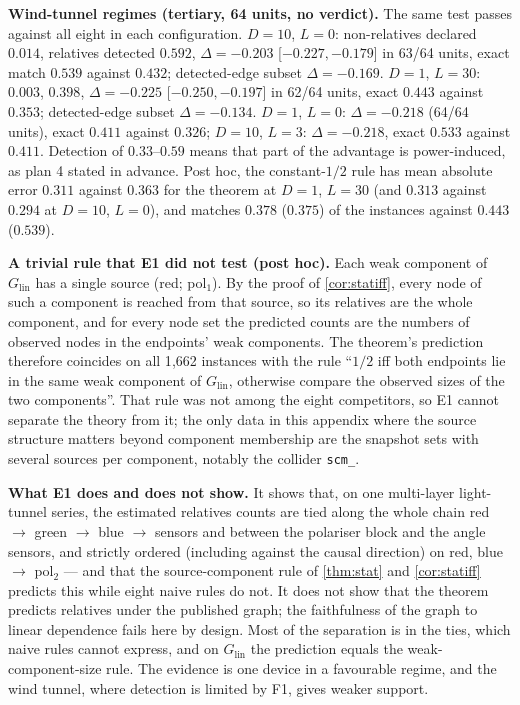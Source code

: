 \textbf{Wind-tunnel regimes (tertiary, 64 units, no verdict).} The same test passes against all eight in each configuration. $D=10$, $L=0$: non-relatives declared $0.014$, relatives detected $0.592$, $\Delta=-0.203$ [$-0.227,-0.179$] in 63/64 units, exact match $0.539$ against $0.432$; detected-edge subset $\Delta=-0.169$.
$D=1$, $L=30$: $0.003$, $0.398$, $\Delta=-0.225$ [$-0.250,-0.197$] in 62/64 units, exact $0.443$ against $0.353$; detected-edge subset $\Delta=-0.134$. $D=1$, $L=0$: $\Delta=-0.218$ (64/64 units), exact $0.411$ against $0.326$; $D=10$, $L=3$: $\Delta=-0.218$, exact $0.533$ against $0.411$.
Detection of $0.33$--$0.59$ means that part of the advantage is power-induced, as plan 4 stated in advance. Post hoc, the constant-$1/2$ rule has mean absolute error $0.311$ against $0.363$ for the theorem at $D=1$, $L=30$ (and $0.313$ against $0.294$ at $D=10$, $L=0$), and matches $0.378$ ($0.375$) of the instances against $0.443$ ($0.539$).

\textbf{A trivial rule that E1 did not test (post hoc).} Each weak component of
$G_{\mathrm{lin}}$ has a single source (red; pol$_1$). By the proof of
\cref{cor:statiff}, every node of such a component is reached from that source,
so its relatives are the whole component, and for every node set the
predicted counts are the numbers of observed nodes in the endpoints' weak
components. The theorem's prediction therefore coincides on all 1{,}662
instances with the rule ``$1/2$ iff both endpoints lie in the same weak
component of $G_{\mathrm{lin}}$, otherwise compare the observed sizes of the two
components''. That rule was not among the eight competitors, so E1 cannot
separate the theory from it; the only data in this appendix where the source
structure matters beyond component membership are the snapshot sets with
several sources per component, notably the collider \texttt{scm\_}.

\textbf{What E1 does and does not show.} It shows that, on one multi-layer light-tunnel series, the estimated relatives counts are tied along the whole chain red $\to$ green $\to$ blue $\to$ sensors and between the polariser block and the angle sensors, and strictly ordered (including against the causal direction) on red, blue $\to$ pol$_2$ --- and that the source-component rule of \cref{thm:stat} and \cref{cor:statiff} predicts this while eight naive rules do not. It does not show that the theorem predicts relatives under the published graph; the faithfulness of the graph to linear dependence fails here by design. Most of the separation is in the ties, which naive rules cannot express, and on $G_{\mathrm{lin}}$ the prediction equals the weak-component-size rule. The evidence is one device in a favourable regime, and the wind tunnel, where detection is limited by F1, gives weaker support.

